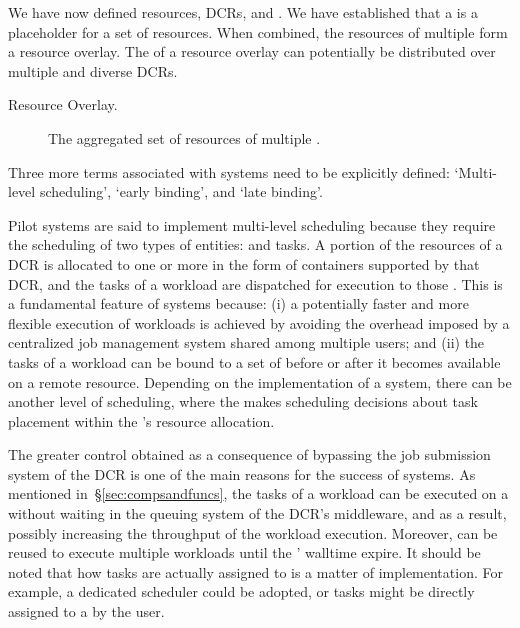 \documentclass{sig-alternate}
\begin{document}
We have now defined resources, DCRs, and \pilots. We have established that a
\pilot is a placeholder for a set of resources. When combined, the resources of
multiple \pilots form a resource overlay. The \pilots of a resource overlay can
potentially be distributed over multiple and diverse DCRs.


\begin{description}
\item[Resource Overlay.] The aggregated set of resources of multiple \pilots.
\end{description}

Three more terms associated with \pilot systems need to be explicitly defined:
`Multi-level scheduling', `early binding', and `late binding'.


Pilot systems are said to implement multi-level scheduling because they require
the scheduling of two types of entities: \pilots and tasks. A portion of the
resources of a DCR is allocated to one or more \pilots in the form of containers
supported by that DCR, and the tasks of a workload are dispatched for execution
to those \pilots. This is a fundamental feature of \pilot systems because: (i) a
potentially faster and more flexible execution of workloads is achieved by
avoiding the overhead imposed by a centralized job management system shared
among multiple users; and (ii) the tasks of a workload can be bound to a set of
\pilots before or after it becomes available on a remote resource. Depending
on the implementation of a \pilot system, there can be another level of
scheduling, where the \pilot makes scheduling decisions about task placement
within the \pilot's resource allocation.


The greater control obtained as a consequence of bypassing the job submission
system of the DCR is one of the main reasons for the success of \pilot systems.
As mentioned in~\S\ref{sec:compsandfuncs}, the tasks of a workload can be
executed on a \pilot without waiting in the queuing system of the DCR's
middleware, and as a result, possibly increasing the throughput of the workload
execution. Moreover, \pilots can be reused to execute multiple workloads until
the \pilots' walltime expire.  It should be noted that how tasks are actually
assigned to \pilots is a matter of implementation. For example, a dedicated
scheduler could be adopted, or tasks might be directly assigned to a \pilot by
the user.
\end{document}
